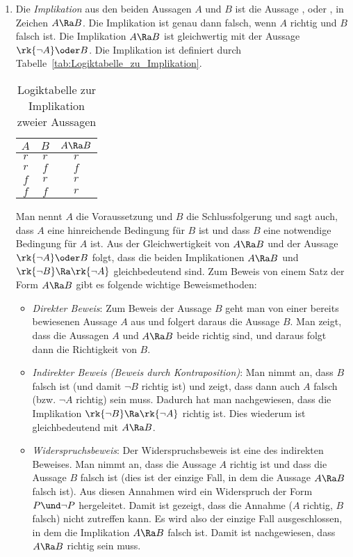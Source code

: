 \begin{enumerate}
\item Die \emph{Implikation} aus den beiden Aussagen $A$ und $B$ ist die Aussage ,  oder , in Zeichen $A \Ra B$. Die Implikation ist genau dann falsch, wenn $A$ richtig und $B$ falsch ist. Die Implikation $A \Ra B$ ist gleichwertig mit der Aussage $\rk{\neg A} \oder B$. Die Implikation ist definiert durch Tabelle~\vref{tab:Logiktabelle_zu_Implikation}.
	\begin{table}[htb]
	\centering
	\begin{tabular}{c|c|c}
	$A$ & $B$ & $A \Ra B$\\
	\hline
	$r$ & $r$ & $r$\\
	$r$ & $f$ & $f$\\
	$f$ & $r$ & $r$\\
	$f$ & $f$ & $r$\\
	\end{tabular}
	\label{tab:Logiktabelle_zu_Implikation}
	\caption{Logiktabelle zur Implikation zweier Aussagen}
	\end{table}

	Man nennt $A$ die Voraussetzung und $B$ die Schlussfolgerung und sagt auch, dass $A$ eine hinreichende Bedingung für $B$ ist und dass $B$ eine notwendige Bedingung für $A$ ist. Aus der Gleichwertigkeit von $A \Ra B$ und der Aussage $\rk{\neg A} \oder B$ folgt, dass die beiden Implikationen $A \Ra B$ und $\rk{\neg B} \Ra \rk{\neg A}$ gleichbedeutend sind. Zum Beweis von einem Satz der Form $A \Ra B$ gibt es folgende wichtige Beweismethoden:
	\begin{itemize}
	\item \emph{Direkter Beweis}: Zum Beweis der Aussage $B$ geht man von einer bereits bewiesenen Aussage $A$ aus und folgert daraus die Aussage $B$. Man zeigt, dass die Aussagen $A$ und $A \Ra B$ beide richtig sind, und daraus folgt dann die Richtigkeit von $B$.
	\item \emph{Indirekter Beweis (Beweis durch Kontraposition)}: Man nimmt an, dass $B$ falsch ist (und damit $\neg B$ richtig ist) und zeigt, dass dann auch $A$ falsch (\ac{bzw.} $\neg A$ richtig) sein muss. Dadurch hat man nachgewiesen, dass die Implikation $\rk{\neg B} \Ra \rk{\neg A}$ richtig ist. Dies wiederum ist gleichbedeutend mit $A \Ra B$.
	\item \emph{Widerspruchsbeweis}: Der Widerspruchsbeweis ist eine  des indirekten Beweises. Man nimmt an, dass die Aussage $A$ richtig ist und dass die Aussage $B$ falsch ist (dies ist der einzige Fall, in dem die Aussage $A \Ra B$ falsch ist). Aus diesen Annahmen wird ein Widerspruch der Form $P \und \neg P$ hergeleitet. Damit ist gezeigt, dass die Annahme ($A$ richtig, $B$ falsch) nicht zutreffen kann. Es wird also der einzige Fall ausgeschlossen, in dem die Implikation $A \Ra B$ falsch ist. Damit ist nachgewiesen, dass $A \Ra B$ richtig sein muss.
	\end{itemize}


\end{enumerate}
